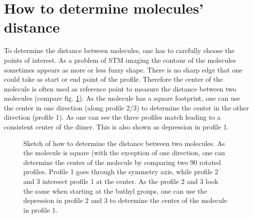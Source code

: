 \label{appendix:TBP}
\section{How to determine molecules' distance}
To determine the distance between molecules, one has to carefully choose the points of interest. As a problem of STM imaging the contour of the molecules sometimes appears as more or less fuzzy shape. There is no sharp edge that one could take as start or end point of the profile. Therefore the center of the molecule is often used as reference point to measure the distance between two molecules (compare fig. \ref{fig:distance-molecules}). As the molecule has a square footprint, one can use the center in one direction (along profile 2/3) to determine the center in the other direction (profile 1). As one can see the three profiles match leading to a consistent center of the dimer. This is also shown as depression in profile 1. 

\begin{figure}[h!]
	\centering
	 \quad
	\caption{Sketch of how to determine the distance between two molecules. As the molecule is square (with the exception of one direction, one can determine the center of the molecule by comparing two \SI{90}{\deg} rotated profiles. Profile 1 goes through the symmetry axis, while profile 2 and 3 intersect profile 1 at the center. As the profile 2 and 3 look the same when starting at the buthyl groups, one can use the depression in profile 2 and 3 to determine the center of the molecule in profile 1.}
	\label{fig:distance-molecules}
\end{figure}

